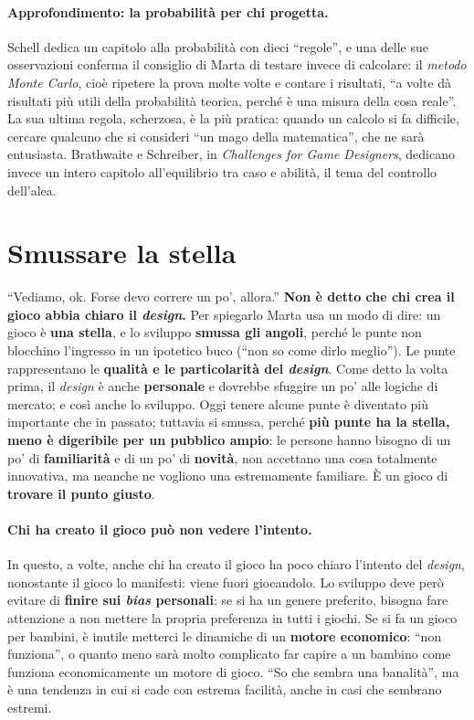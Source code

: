 \paragraph{Approfondimento: la probabilità per chi progetta.} Schell dedica un capitolo alla
probabilità con dieci ``regole'', e una delle sue osservazioni conferma il consiglio di Marta
di testare invece di calcolare: il \emph{metodo Monte Carlo}, cioè ripetere la prova molte volte
e contare i risultati, ``a volte dà risultati più utili della probabilità teorica, perché è una
misura della cosa reale''. La sua ultima regola, scherzosa, è la più pratica: quando un calcolo
si fa difficile, cercare qualcuno che si consideri ``un mago della matematica'', che ne sarà
entusiasta. Brathwaite e Schreiber, in \emph{Challenges for Game Designers}, dedicano invece un
intero capitolo all'equilibrio tra caso e abilità, il tema del controllo dell'alea.

\section{Smussare la stella}
\label{a14:sec:stella}

``Vediamo, ok. Forse devo correre un po', allora.'' \textbf{Non è detto che chi crea il gioco
abbia chiaro il \emph{design}.} Per spiegarlo Marta usa un modo di dire: un gioco è
\textbf{una stella}, e lo sviluppo \textbf{smussa gli angoli}, perché le punte non blocchino
l'ingresso in un ipotetico buco (``non so come dirlo meglio''). Le punte rappresentano le
\textbf{qualità e le particolarità del \emph{design}}. Come detto la volta prima, il
\emph{design} è anche \textbf{personale} e dovrebbe sfuggire un po' alle logiche di mercato; e
così anche lo sviluppo. Oggi tenere alcune punte è diventato più importante che in passato;
tuttavia si smussa, perché \textbf{più punte ha la stella, meno è digeribile per un pubblico
ampio}: le persone hanno bisogno di un po' di \textbf{familiarità} e di un po' di
\textbf{novità}, non accettano una cosa totalmente innovativa, ma neanche ne vogliono una
estremamente familiare. È un gioco di \textbf{trovare il punto giusto}.

\paragraph{Chi ha creato il gioco può non vedere l'intento.} In questo, a volte, anche chi ha
creato il gioco ha poco chiaro l'intento del \emph{design}, nonostante il gioco lo manifesti:
viene fuori giocandolo. Lo sviluppo deve però evitare di \textbf{finire sui \emph{bias}
personali}: se si ha un genere preferito, bisogna fare attenzione a non mettere la propria
preferenza in tutti i giochi. Se si fa un gioco per bambini, è inutile metterci le dinamiche di
un \textbf{motore economico}: ``non funziona'', o quanto meno sarà molto complicato far capire a
un bambino come funziona economicamente un motore di gioco. ``So che sembra una banalità'', ma è
una tendenza in cui si cade con estrema facilità, anche in casi che sembrano estremi.

